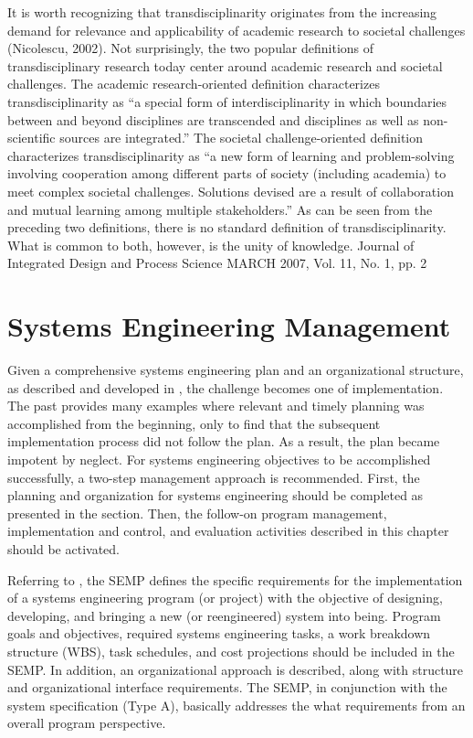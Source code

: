 It is worth recognizing that transdisciplinarity originates from the increasing demand for relevance and applicability of academic research to societal challenges (Nicolescu, 2002). Not surprisingly, the two popular definitions of transdisciplinary research today center around academic research and societal challenges. The academic research-oriented definition characterizes transdisciplinarity as ``a special form of interdisciplinarity in which boundaries between and beyond disciplines are transcended and disciplines as well as non-scientific sources are integrated.'' The societal challenge-oriented definition characterizes transdisciplinarity as ``a new form of learning and problem-solving involving cooperation among different parts of society (including academia) to meet complex societal challenges. Solutions devised are a result of collaboration and mutual learning among multiple stakeholders.'' As can be seen from the preceding two definitions, there is no standard definition of transdisciplinarity. What is common to both, however, is the unity of knowledge. Journal of Integrated Design and Process Science MARCH 2007, Vol. 11, No. 1, pp. 2


\section{Systems Engineering Management}

Given a comprehensive systems engineering plan and an organizational structure, as described and developed in , the challenge becomes one of implementation. The past provides many examples where relevant and timely planning was accomplished from the beginning, only to find that the subsequent implementation process did not follow the plan. As a result, the plan became impotent by neglect. For systems engineering objectives to be accomplished successfully, a two-step management approach is recommended. First, the planning and organization for systems engineering should be completed as presented in the section. Then, the follow-on program management, implementation and control, and evaluation activities described in this chapter should be activated.

Referring to , the SEMP defines the specific requirements for the implementation of a systems engineering program (or project) with the objective of designing, developing, and bringing a new (or reengineered) system into being. Program goals and objectives, required systems engineering tasks, a work breakdown structure (WBS), task schedules, and cost projections should be included in the SEMP. In addition, an organizational approach is described, along with structure and organizational interface requirements. The SEMP, in conjunction with the system specification (Type A), basically addresses the what requirements from an overall program perspective.

